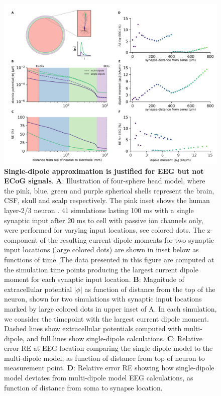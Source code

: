 \documentclass[preprint,10pt,authoryear]{elsarticle}
\newcommand{\hlg}[2][Emerald]{ {\sethlcolor{#1} \hl{#2}} }
\newcommand{\sntxt}[1]{{\color{NavyBlue}#1}}
\newcommand{\tvnnote}[1]{\color{white}{\hlg{TVN: #1 }}\color{black}}
\begin{document}
\begin{figure}[H]
	\centering
	\includegraphics[width=1.0\textwidth]{figure2.png}
	\caption{\textbf{Single-dipole approximation is justified for EEG but not ECoG signals}. 
	\textbf{A}: Illustration of four-sphere head model, where the pink, blue, green and purple spherical shells represent the brain, CSF, skull and scalp respectively. The pink inset shows the human layer-2/3 neuron \citep{EYAL2016}. $41$ simulations lasting 100 ms with a single synaptic input after 20 ms to cell with passive ion channels only, were performed for varying input locations, see colored dots. \sntxt{The z-component of the resulting current dipole moments for two synaptic input locations (large colored dots) are shown in inset below as functions of time. The data presented in this figure are computed at the simulation time points producing the largest current dipole moment for each synaptic input location.}
	\textbf{B}: Magnitude of extracellular potential $|\phi|$ as function of distance from the top of the neuron, shown for two simulations with synaptic input locations marked by large colored dots in upper inset of A. In each simulation, we consider the timepoint with the largest current dipole moment. Dashed lines show extracellular potentials computed with multi-dipole, and full lines show single-dipole calculations.
	\textbf{C}: Relative error RE at EEG location comparing the single-dipole model to the multi-dipole model, as function of distance from top of neuron to measurement point.
	\textbf{D}: Relative error RE showing how single-dipole model deviates from multi-dipole model EEG calculations, as function of distance from soma to synapse location.
}
\end{figure}
\end{document}
